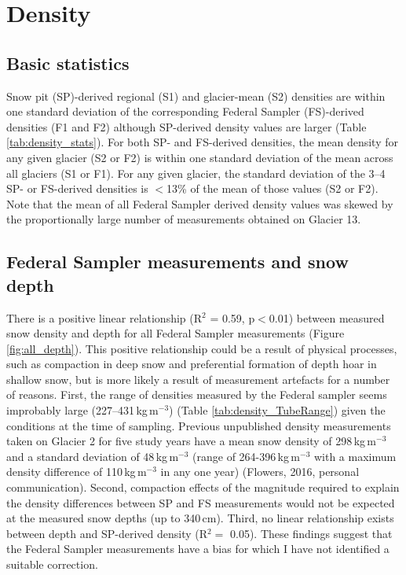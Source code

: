 \documentclass{sfuthesis}
\begin{document}
\section{Density}
\label{sec:density}

\subsection{Basic statistics}

Snow pit (SP)-derived regional (S1) and glacier-mean (S2) densities are within one standard deviation of the corresponding Federal Sampler (FS)-derived densities (F1 and F2) although SP-derived density values are larger (Table \ref{tab:density_stats}). For both SP- and FS-derived densities, the mean density for any given glacier (S2 or F2) is within one standard deviation of the mean across all glaciers (S1 or F1). For any given glacier, the standard deviation of the 3--4 SP- or FS-derived densities is $<$13\% of the mean of those values (S2 or F2). Note that the mean of all Federal Sampler derived density values was skewed by the proportionally large number of measurements obtained on Glacier 13.

\subsection{Federal Sampler measurements and snow depth}
\label{sec:FSdensity&depth}

There is a positive linear relationship (R$^2$ = 0.59, p$<$0.01) between measured snow density and depth for all Federal Sampler measurements (Figure \ref{fig:all_depth}). This positive relationship could be a result of physical processes, such as compaction in deep snow and preferential formation of depth hoar in shallow snow, but is more likely a result of measurement artefacts for a number of reasons. First, the range of densities measured by the Federal sampler seems improbably large (227--431\,kg\,m$^{-3}$) (Table \ref{tab:density_TubeRange})  given the conditions at the time of sampling. Previous unpublished density measurements taken on Glacier 2 for five study years have a mean snow density of 298\,kg\,m$^{-3}$ and a standard deviation of 48\,kg\,m$^{-3}$ (range of 264-396\,kg\,m$^{-3}$ with a maximum density difference of 110\,kg\,m$^{-3}$ in any one year) (Flowers, 2016, personal communication). Second, compaction effects of the magnitude required to explain the density differences between SP and FS measurements would not be expected at the measured snow depths (up to 340\,cm). Third, no linear relationship exists between depth and SP-derived density (R$^2 =$ 0.05). These findings suggest that the Federal Sampler measurements have a bias for which I have not identified a suitable correction. 
\end{document}
